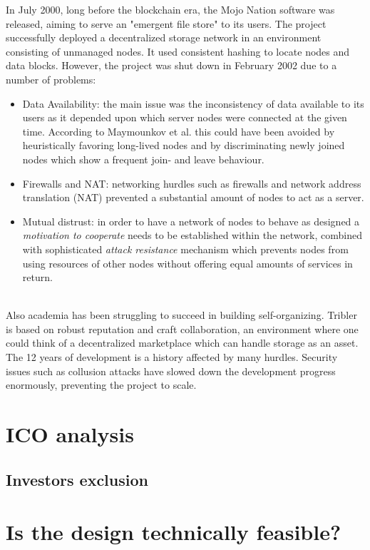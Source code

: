 \documentclass[journal]{IEEEtran}
\begin{document}
In July 2000, long before the blockchain era, the Mojo Nation software \cite{mojo-nation} was released, aiming to serve an "emergent file store" to its users.
The project successfully deployed a decentralized storage network in an environment consisting of unmanaged nodes.
It used consistent hashing \cite{consistent-hashing} to locate nodes and data blocks.
However, the project was shut down in February 2002 due to a number of problems:
\begin{itemize}
\item Data Availability: the main issue was the inconsistency of data available to its users as it depended upon which server nodes were connected at the given time.
According to Maymounkov et al.\cite{peer-to-peer-xor} this could have been avoided by heuristically favoring long-lived nodes and by discriminating newly joined nodes which show a frequent join- and leave behaviour.
\item Firewalls and NAT: networking hurdles such as firewalls and network address translation (NAT) prevented a substantial amount of nodes to act as a server.
\item Mutual distrust: in order to have a network of nodes to behave as designed a \textit{motivation to cooperate} needs to be established within the network, combined with sophisticated \textit{attack resistance} mechanism which prevents nodes from using resources of other nodes without offering equal amounts of services in return.
\end{itemize}
\hfill
\\
Also academia has been struggling to succeed in building self-organizing.
Tribler\cite{tribler} is based on robust reputation and craft collaboration, an environment where one could think of a decentralized marketplace which can handle storage as an asset.
The 12 years of development is a history affected by many hurdles.
Security issues such as collusion attacks\cite{tribler-hurdles} have slowed down the development progress enormously, preventing the project to scale.

\section{ICO analysis}
\label{sec:ico-analysis}

\subsection{Investors exclusion}

\section{Is the design technically feasible?}
\end{document}
